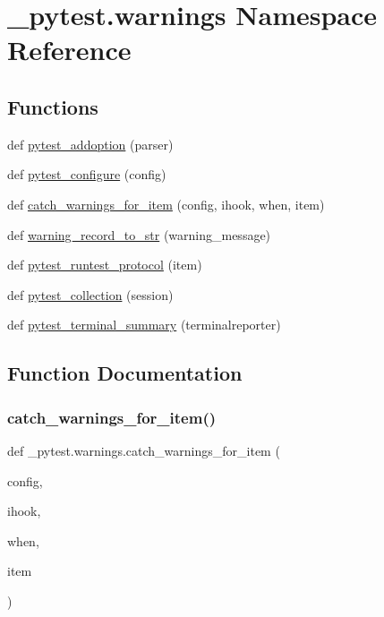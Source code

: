 \hypertarget{namespace__pytest_1_1warnings}{}\section{\+\_\+pytest.\+warnings Namespace Reference}
\label{namespace__pytest_1_1warnings}
\subsection*{Functions}
\begin{DoxyCompactItemize}
\item 
def \hyperlink{namespace__pytest_1_1warnings_ac0f4073b618ceebb7d9d0cd4f963c38f}{pytest\+\_\+addoption} (parser)
\item 
def \hyperlink{namespace__pytest_1_1warnings_aae727a9e4545555b3bcf9f8042c69eac}{pytest\+\_\+configure} (config)
\item 
def \hyperlink{namespace__pytest_1_1warnings_af1306aff34a4450e3a379b5618787d14}{catch\+\_\+warnings\+\_\+for\+\_\+item} (config, ihook, when, item)
\item 
def \hyperlink{namespace__pytest_1_1warnings_a83b34eca5850e04a5604197e2c2666b6}{warning\+\_\+record\+\_\+to\+\_\+str} (warning\+\_\+message)
\item 
def \hyperlink{namespace__pytest_1_1warnings_a0eeee30a34091403585154387a18d175}{pytest\+\_\+runtest\+\_\+protocol} (item)
\item 
def \hyperlink{namespace__pytest_1_1warnings_a1cd8386af75b21e83acbf236950b8d66}{pytest\+\_\+collection} (session)
\item 
def \hyperlink{namespace__pytest_1_1warnings_acc5a1dc3ecfb364a1a980f7cc6eae1e1}{pytest\+\_\+terminal\+\_\+summary} (terminalreporter)
\end{DoxyCompactItemize}


\subsection{Function Documentation}
\mbox{\label{namespace__pytest_1_1warnings_af1306aff34a4450e3a379b5618787d14}} 
\subsubsection{\texorpdfstring{catch\+\_\+warnings\+\_\+for\+\_\+item()}{catch\_warnings\_for\_item()}}
{\footnotesize\ttfamily def \+\_\+pytest.\+warnings.\+catch\+\_\+warnings\+\_\+for\+\_\+item (\begin{DoxyParamCaption}\item[{}]{config,  }\item[{}]{ihook,  }\item[{}]{when,  }\item[{}]{item }\end{DoxyParamCaption})}

